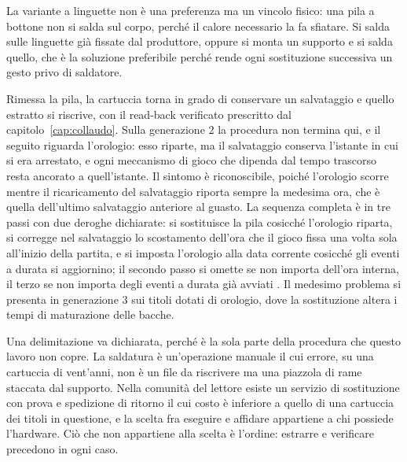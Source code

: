 La variante a linguette non è una preferenza ma un vincolo fisico: una pila a bottone non si salda sul corpo, perché il calore necessario la fa sfiatare. Si salda sulle linguette già fissate dal produttore, oppure si monta un supporto e si salda quello, che è la soluzione preferibile perché rende ogni sostituzione successiva un gesto privo di saldatore.

Rimessa la pila, la cartuccia torna in grado di conservare un salvataggio e quello estratto si riscrive, con il read-back verificato prescritto dal capitolo~\ref{cap:collaudo}. Sulla generazione 2 la procedura non termina qui, e il seguito riguarda l'orologio: esso riparte, ma il salvataggio conserva l'istante in cui si era arrestato, e ogni meccanismo di gioco che dipenda dal tempo trascorso resta ancorato a quell'istante. Il sintomo è riconoscibile, poiché l'orologio scorre mentre il ricaricamento del salvataggio riporta sempre la medesima ora, che è quella dell'ultimo salvataggio anteriore al guasto. La sequenza completa è in tre passi con due deroghe dichiarate: si sostituisce la pila cosicché l'orologio riparta, si corregge nel salvataggio lo scostamento dell'ora che il gioco fissa una volta sola all'inizio della partita, e si imposta l'orologio alla data corrente cosicché gli eventi a durata si aggiornino; il secondo passo si omette se non importa dell'ora interna, il terzo se non importa degli eventi a durata già avviati \cite{insidegadgets-canale}. Il medesimo problema si presenta in generazione 3 sui titoli dotati di orologio, dove la sostituzione altera i tempi di maturazione delle bacche.

Una delimitazione va dichiarata, perché è la sola parte della procedura che questo lavoro non copre. La saldatura è un'operazione manuale il cui errore, su una cartuccia di vent'anni, non è un file da riscrivere ma una piazzola di rame staccata dal supporto. Nella comunità del lettore esiste un servizio di sostituzione con prova e spedizione di ritorno il cui costo è inferiore a quello di una cartuccia dei titoli in questione, e la scelta fra eseguire e affidare appartiene a chi possiede l'hardware. Ciò che non appartiene alla scelta è l'ordine: estrarre e verificare precedono in ogni caso.

